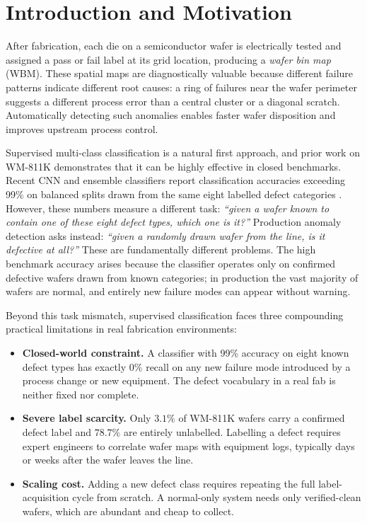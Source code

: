\documentclass[11pt]{article}
\begin{document}
\newpage
\tableofcontents
\newpage


\section{Introduction and Motivation}
\label{sec:problem}

After fabrication, each die on a semiconductor wafer is electrically tested and
assigned a pass or fail label at its grid location, producing a \emph{wafer bin
map} (WBM). These spatial maps are diagnostically valuable because different
failure patterns indicate different root causes: a ring of failures near the wafer
perimeter suggests a different process error than a central cluster or a diagonal
scratch. Automatically detecting such anomalies enables faster wafer disposition
and improves upstream process control.

Supervised multi-class classification is a natural first approach, and prior work
on WM-811K demonstrates that it can be highly effective in closed benchmarks.
Recent CNN and ensemble classifiers report classification accuracies exceeding
99\% on balanced splits drawn from the same eight labelled defect categories
\cite{khatun2026cbam, taha2025survey}. However, these numbers measure a
different task: \emph{``given a wafer known to contain one of these eight defect
types, which one is it?''} Production anomaly detection asks instead:
\emph{``given a randomly drawn wafer from the line, is it defective at all?''}
These are fundamentally different problems. The high benchmark accuracy arises
because the classifier operates only on confirmed defective wafers drawn from
known categories; in production the vast majority of wafers are normal, and
entirely new failure modes can appear without warning.

Beyond this task mismatch, supervised classification faces three compounding
practical limitations in real fabrication environments:

\begin{itemize}[leftmargin=1.5em]
  \item \textbf{Closed-world constraint.} A classifier with 99\% accuracy on
        eight known defect types has exactly 0\% recall on any new failure mode
        introduced by a process change or new equipment. The defect vocabulary
        in a real fab is neither fixed nor complete.
  \item \textbf{Severe label scarcity.} Only $3.1\%$ of WM-811K wafers carry a
        confirmed defect label and $78.7\%$ are entirely unlabelled. Labelling
        a defect requires expert engineers to correlate wafer maps with equipment
        logs, typically days or weeks after the wafer leaves the line.
  \item \textbf{Scaling cost.} Adding a new defect class requires repeating the
        full label-acquisition cycle from scratch. A normal-only system needs
        only verified-clean wafers, which are abundant and cheap to collect.
\end{itemize}
\end{document}
